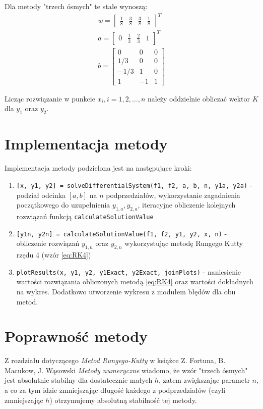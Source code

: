 \documentclass[12pt]{article}
\begin{document}
	Dla metody "trzech ósmych" te stałe wynoszą:
	\begin{align*}
		w = \begin{bmatrix}
			\frac{1}{8} & \frac{3}{8} & \frac{3}{8} & \frac{1}{8}
		\end{bmatrix}^T
		\\
		a = \begin{bmatrix}
			0 & \frac{1}{3} & \frac{2}{3} & 1
		\end{bmatrix}^T
		\\
		b = \begin{bmatrix}
			0 & 0 & 0 \\
			1/3 &  0  & 0 \\
			-1/3 & 1 & 0 \\
			1 & -1 &  1
		\end{bmatrix}
	\end{align*}
	
	Licząc rozwiązanie w punkcie $x_{i}, i = 1, 2, \dots, n$ należy oddzielnie obliczać wektor $K$ dla $y_1$ oraz $y_2$.
	
	
	
	\section{Implementacja metody}
	Implementacja metody podzielona jest na następujące kroki:
	\begin{enumerate}
		\item \texttt{[x, y1, y2] = solveDifferentialSystem(f1, f2, a, b, n, y1a, y2a)} - podział odcinka $[a, b]$ na $n$ podprzedziałów, wykorzystanie zagadnienia początkowego do uzupełnienia $y_{1, a}, y_{2, a}$, iteracyjne obliczenie kolejnych rozwiązań funkcją \texttt{calculateSolutionValue}
		
		\item \texttt{[y1n, y2n] = calculateSolutionValue(f1, f2, y1, y2, x, n)} - obliczenie rozwiązań $y_{1, n}$ oraz $y_{2, n}$ wykorzystując metodę Rungego Kutty rzędu 4 (wzór \eqref{eq:RK4})
		
		\item \texttt{plotResults(x, y1, y2, y1Exact, y2Exact, joinPlots)} - naniesienie wartości rozwiązania obliczonych metodą \eqref{eq:RK4} oraz wartości dokładnych na wykres. Dodatkowo utworzenie wykresu z modułem błędów dla obu metod.
	\end{enumerate}

	
	
	\section{Poprawność metody}
	Z rozdziału dotyczącego \textit{Metod Rungego-Kutty} w książce Z. Fortuna, B. Macukow, J. Wąsowski \textit{Metody numeryczne} wiadomo, że wzór "trzech ósmych" jest absolutnie stabilny dla dostatecznie małych $h$, zatem zwiększając parametr $n$, a co za tym idzie zmniejszając długość każdego z podprzedziałów (czyli zmniejszając $h$) otrzymujemy absolutną stabilność tej metody.
	
\end{document}
